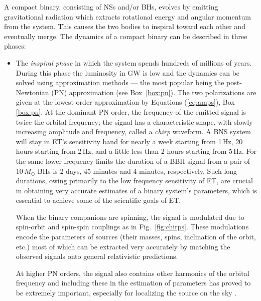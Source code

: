 A compact binary, consisting of NSs and/or BHs,
evolves by emitting gravitational radiation which extracts rotational energy 
and angular momentum from the system. This causes the two bodies to
inspiral toward each other and eventually merge. The dynamics of a compact 
binary can be described in three phases:
\begin{itemize}
 \item The \emph{inspiral phase} in which the
system spends hundreds of millions of years. During this phase the luminosity
in GW is low and the dynamics can be solved using approximation
methods --- the most popular being the post-Newtonian (PN) approximation
(see Box~\ref{box:pn}). The two polarizations are given at the lowest order
approximation by Equations (\ref{eq:amps}), Box \ref{box:pn}. At the dominant
PN order, the frequency of the emitted signal is twice the orbital frequency;
the signal has a characteristic shape, with slowly increasing amplitude and 
frequency, called a \emph{chirp} waveform. A BNS system will stay in
ET's sensitivity band for nearly a week starting from 1\,Hz, 20 hours starting from
2\,Hz, and a little less than 2 hours starting from 5\,Hz. For the same lower frequency 
limits the duration of a BBH signal from a pair of 10$\,M_\odot$ BHs is 2 days, 
45 minutes and 4 minutes, respectively. Such long durations, owing primarily 
to the low frequency sensitivity of ET, are crucial in obtaining very accurate 
estimates of a binary system's parameters, which is essential to achieve some 
of the scientific goals of ET.

When the binary companions are spinning, the signal is modulated due to 
spin-orbit and spin-spin couplings as in Fig.\ \ref{fig:chirps}. These modulations
encode the parameters of sources (their masses, spins, inclination of the orbit,
etc.) most of which can be extracted very accurately 
\cite{Arun:2005,Vecchio:2003tn,vanderSluys:2008qx,Lang:1900bz} by matching 
the observed signals onto general relativistic predictions.

At higher PN orders, the signal also contains other harmonics of the orbital
frequency and including these in the estimation of parameters has proved to
be extremely important, especially for localizing the source on the sky
\cite{VanDenBroeck:2006ar,Broeck2007,Arun:2007hu}.



\end{itemize}
